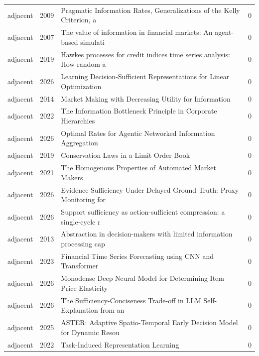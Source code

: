 \begin{longtable}{llp{9.2cm}r}
adjacent & 2009 & Pragmatic Information Rates, Generalizations of the Kelly Criterion, a~\citep{weinberger2009pragmatic} & 0 \\
adjacent & 2007 & The value of information in financial markets: An agent-based simulati~\citep{toth2007value} & 0 \\
adjacent & 2019 & Hawkes processes for credit indices time series analysis: How random a~\citep{bahamou2019hawkes} & 0 \\
adjacent & 2026 & Learning Decision-Sufficient Representations for Linear Optimization~\citep{ye2026learning} & 0 \\
adjacent & 2014 & Market Making with Decreasing Utility for Information~\citep{dudik2014market} & 0 \\
adjacent & 2022 & The Information Bottleneck Principle in Corporate Hierarchies~\citep{gordon2022information} & 0 \\
adjacent & 2026 & Optimal Rates for Agentic Networked Information Aggregation~\citep{bateni2026optimal} & 0 \\
adjacent & 2019 & Conservation Laws in a Limit Order Book~\citep{rosenzweig2019conservation} & 0 \\
adjacent & 2021 & The Homogenous Properties of Automated Market Makers~\citep{jensen2021homogenous} & 0 \\
adjacent & 2026 & Evidence Sufficiency Under Delayed Ground Truth: Proxy Monitoring for ~\citep{solozobov2026evidence} & 0 \\
adjacent & 2026 & Support sufficiency as action-sufficient compression: a single-cycle r~\citep{walsh2026support} & 0 \\
adjacent & 2013 & Abstraction in decision-makers with limited information processing cap~\citep{genewein2013abstraction} & 0 \\
adjacent & 2023 & Financial Time Series Forecasting using CNN and Transformer~\citep{zeng2023financial} & 0 \\
adjacent & 2026 & Monodense Deep Neural Model for Determining Item Price Elasticity~\citep{garg2026monodense} & 0 \\
adjacent & 2026 & The Sufficiency-Conciseness Trade-off in LLM Self-Explanation from an ~\citep{zahedzadeh2026sufficiency} & 0 \\
adjacent & 2025 & ASTER: Adaptive Spatio-Temporal Early Decision Model for Dynamic Resou~\citep{chen2025aster} & 0 \\
adjacent & 2022 & Task-Induced Representation Learning~\citep{yamada2022task} & 0 \\
\end{longtable}
